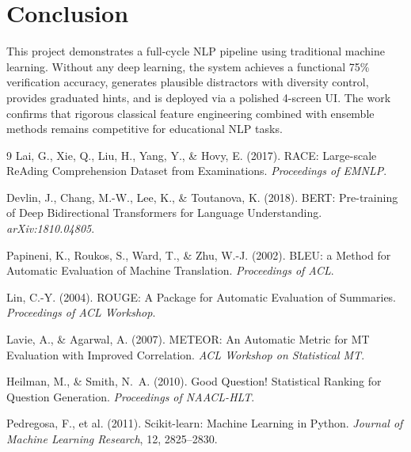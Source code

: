 \documentclass[10pt,twocolumn]{article}
\begin{document}
\section{Conclusion}
This project demonstrates a full-cycle NLP pipeline using traditional machine learning. Without any deep learning, the system achieves a functional 75\% verification accuracy, generates plausible distractors with diversity control, provides graduated hints, and is deployed via a polished 4-screen UI. The work confirms that rigorous classical feature engineering combined with ensemble methods remains competitive for educational NLP tasks.

\begin{thebibliography}{9}
Lai, G., Xie, Q., Liu, H., Yang, Y., \& Hovy, E. (2017). RACE: Large-scale ReAding Comprehension Dataset from Examinations. \textit{Proceedings of EMNLP}.

Devlin, J., Chang, M.-W., Lee, K., \& Toutanova, K. (2018). BERT: Pre-training of Deep Bidirectional Transformers for Language Understanding. \textit{arXiv:1810.04805}.

Papineni, K., Roukos, S., Ward, T., \& Zhu, W.-J. (2002). BLEU: a Method for Automatic Evaluation of Machine Translation. \textit{Proceedings of ACL}.

Lin, C.-Y. (2004). ROUGE: A Package for Automatic Evaluation of Summaries. \textit{Proceedings of ACL Workshop}.

Lavie, A., \& Agarwal, A. (2007). METEOR: An Automatic Metric for MT Evaluation with Improved Correlation. \textit{ACL Workshop on Statistical MT}.

Heilman, M., \& Smith, N.~A. (2010). Good Question! Statistical Ranking for Question Generation. \textit{Proceedings of NAACL-HLT}.

Pedregosa, F., et al. (2011). Scikit-learn: Machine Learning in Python. \textit{Journal of Machine Learning Research}, 12, 2825--2830.
\end{thebibliography}
\end{document}

